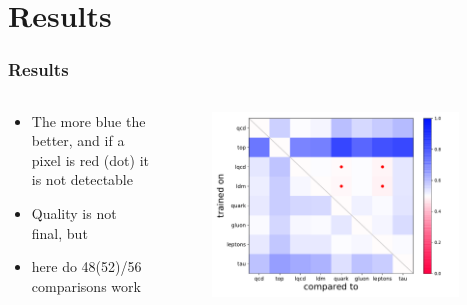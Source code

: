 \documentclass[hyperref={pdfpagelabels=false}]{beamer}
\begin{document}
\section{Results}\label{sec:Results}



\begin{frame}[label=data_0]
\frametitle{Results}
\begin{columns}[c] %
\begin{column}{0.3\textwidth}%
\begin{itemize}

    \item The more blue the better, and if a pixel is red (dot) it is not detectable

    \item Quality is not final, but

    \item here do 48(52)/56 comparisons work


\end{itemize}
\end{column}%
\hfill%
\begin{column}{0.68\textwidth}%
\begin{figure}[H] 
  \centering
\includegraphics[width=0.95\textwidth]{../imgs/crosssep}
\label{fig:crosssep}
  \end{figure}


\end{column}%
\hfill%
\end{columns}

\end{frame}
\end{document}
